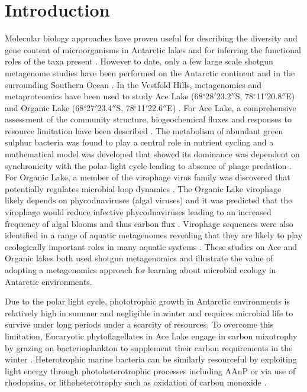 \section{Introduction}
Molecular biology approaches have proven useful for describing the diversity and gene content of microorganisms in Antarctic lakes and for inferring the functional roles of the taxa present \cite{Laybourn-Parry2007}.
However to date, only a few large scale shotgun metagenome studies have been performed on the Antarctic continent and in the surrounding Southern Ocean \cite{Wilkins2012a}. 
In the Vestfold Hills, metagenomics and metaproteomics have been used to study Ace Lake (68$^{\circ}$28$'$23.2$''$S, 78$^{\circ}$11$'$20.8$''$E) and Organic Lake (68$^{\circ}$27$'$23.4$''$S, 78$^{\circ}$11$'$22.6$''$E) \cite{Ng2010a, Lauro2011}.
For Ace Lake, a comprehensive assessment of the community structure, biogeochemical fluxes and responses to resource limitation have been described \cite{Lauro2011}.
The metabolism of abundant green sulphur bacteria \cite{Ng2010a} was found to play a central role in nutrient cycling and a mathematical model was developed that showed its dominance was dependent on synchronicity with the polar light cycle leading to absence of phage predation \cite{Lauro2011}.
For Organic Lake, a member of the virophage virus family was discovered that potentially regulates microbial loop dynamics \cite{Yau2011}. 
The Organic Lake virophage likely depends on phycodnaviruses (algal viruses) and it was predicted that the virophage would reduce infective phycodnaviruses leading to an increased frequency of algal blooms and thus carbon flux \cite{Yau2011}.
Virophage sequences were also identified in a range of aquatic metagenomes revealing that they are likely to play ecologically important roles in many aquatic systems \cite{Yau2011}. 
These studies on Ace and Organic lakes both used shotgun metagenomics and illustrate the value of adopting a metagenomics approach for learning about microbial ecology in Antarctic environments.

Due to the polar light cycle, phototrophic growth in Antarctic environments is relatively high in summer and negligible in winter \cite{Laybourn-Parry2005} and requires microbial life to survive under long periods under a scarcity of resources.
To overcome this limitation, Eucaryotic phytoflagellates in Ace Lake engage in carbon mixotrophy by grazing on bacterioplankton to supplement their carbon requirements in the winter \cite{Laybourn-Parry2005}.
Heterotrophic marine bacteria can be similarly resourceful by exploiting light energy through photoheterotrophic processes including \ac{AAnP} or via use of rhodopsins, or lithoheterotrophy such as oxidation of carbon monoxide \cite{Moran2007b}.

